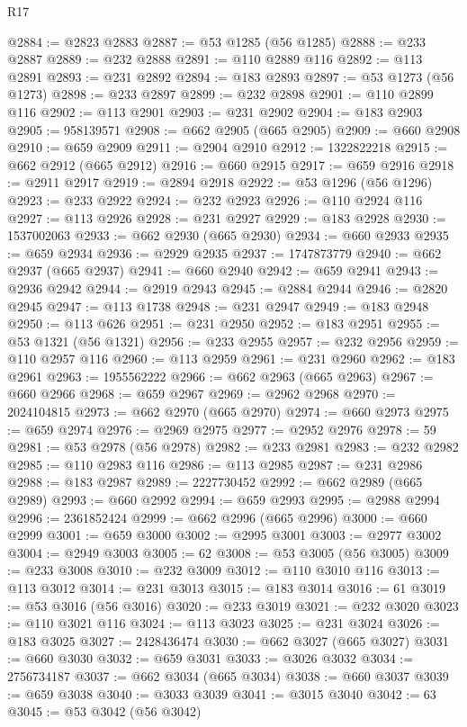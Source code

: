 \begin{lexlean}{R17}
\begin{coremodule}
{{{{{{{{{{{{{{{{{{{{{{{{{{{{{{{{{{{{{{{{{{{{{{{{{{{{{{{{{{{{{{{{{{{{{{{{{{{{{{{{{{{{{@2884 := @2823 @2883
@2887 := @53 @1285 (@56 @1285)
@2888 := @233 @2887
@2889 := @232 @2888
@2891 := @110 @2889 @116
@2892 := @113 @2891
@2893 := @231 @2892
@2894 := @183 @2893
@2897 := @53 @1273 (@56 @1273)
@2898 := @233 @2897
@2899 := @232 @2898
@2901 := @110 @2899 @116
@2902 := @113 @2901
@2903 := @231 @2902
@2904 := @183 @2903
@2905 := 958139571
@2908 := @662 @2905 (@665 @2905)
@2909 := @660 @2908
@2910 := @659 @2909
@2911 := @2904 @2910
@2912 := 1322822218
@2915 := @662 @2912 (@665 @2912)
@2916 := @660 @2915
@2917 := @659 @2916
@2918 := @2911 @2917
@2919 := @2894 @2918
@2922 := @53 @1296 (@56 @1296)
@2923 := @233 @2922
@2924 := @232 @2923
@2926 := @110 @2924 @116
@2927 := @113 @2926
@2928 := @231 @2927
@2929 := @183 @2928
@2930 := 1537002063
@2933 := @662 @2930 (@665 @2930)
@2934 := @660 @2933
@2935 := @659 @2934
@2936 := @2929 @2935
@2937 := 1747873779
@2940 := @662 @2937 (@665 @2937)
@2941 := @660 @2940
@2942 := @659 @2941
@2943 := @2936 @2942
@2944 := @2919 @2943
@2945 := @2884 @2944
@2946 := @2820 @2945
@2947 := @113 @1738
@2948 := @231 @2947
@2949 := @183 @2948
@2950 := @113 @626
@2951 := @231 @2950
@2952 := @183 @2951
@2955 := @53 @1321 (@56 @1321)
@2956 := @233 @2955
@2957 := @232 @2956
@2959 := @110 @2957 @116
@2960 := @113 @2959
@2961 := @231 @2960
@2962 := @183 @2961
@2963 := 1955562222
@2966 := @662 @2963 (@665 @2963)
@2967 := @660 @2966
@2968 := @659 @2967
@2969 := @2962 @2968
@2970 := 2024104815
@2973 := @662 @2970 (@665 @2970)
@2974 := @660 @2973
@2975 := @659 @2974
@2976 := @2969 @2975
@2977 := @2952 @2976
@2978 := 59
@2981 := @53 @2978 (@56 @2978)
@2982 := @233 @2981
@2983 := @232 @2982
@2985 := @110 @2983 @116
@2986 := @113 @2985
@2987 := @231 @2986
@2988 := @183 @2987
@2989 := 2227730452
@2992 := @662 @2989 (@665 @2989)
@2993 := @660 @2992
@2994 := @659 @2993
@2995 := @2988 @2994
@2996 := 2361852424
@2999 := @662 @2996 (@665 @2996)
@3000 := @660 @2999
@3001 := @659 @3000
@3002 := @2995 @3001
@3003 := @2977 @3002
@3004 := @2949 @3003
@3005 := 62
@3008 := @53 @3005 (@56 @3005)
@3009 := @233 @3008
@3010 := @232 @3009
@3012 := @110 @3010 @116
@3013 := @113 @3012
@3014 := @231 @3013
@3015 := @183 @3014
@3016 := 61
@3019 := @53 @3016 (@56 @3016)
@3020 := @233 @3019
@3021 := @232 @3020
@3023 := @110 @3021 @116
@3024 := @113 @3023
@3025 := @231 @3024
@3026 := @183 @3025
@3027 := 2428436474
@3030 := @662 @3027 (@665 @3027)
@3031 := @660 @3030
@3032 := @659 @3031
@3033 := @3026 @3032
@3034 := 2756734187
@3037 := @662 @3034 (@665 @3034)
@3038 := @660 @3037
@3039 := @659 @3038
@3040 := @3033 @3039
@3041 := @3015 @3040
@3042 := 63
@3045 := @53 @3042 (@56 @3042)
}}}}}}}}}}}}}}}}}}}}}}}}}}}}}}}}}}}}}}}}}}}}}}}}}}}}}}}}}}}}}}}}}}}}}}}}}}}}}}}}}}}}}
\end{coremodule}
\end{lexlean}
